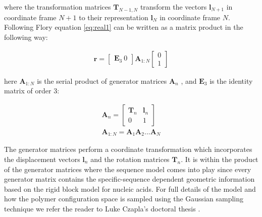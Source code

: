 where the transformation matrices $\textbf{T}_{N-1,N}$ transform the
vectors $\textbf{l}_{N+1}$ in coordinate frame $N+1$ to their
representation $\textbf{l}_{N}$ in coordinate frame $N$.
Following Flory \cite{flory1969} equation \ref{eq:real1} can be
written as a matrix product in the following way:

\begin{gather}
\textbf{r}= \begin{bmatrix}\textbf{E}_{3}~ 0 \end{bmatrix} \textbf{A}_{1:N}\begin{bmatrix} 0 \\ 1 \end{bmatrix}
\end{gather}

here $\textbf{A}_{1:N}$ is the serial product of generator matrices
$\textbf{A}_{n}$ \cite{marky1994a}, and $\textbf{E}_{3}$ is the
identity matrix of order 3:

\begin{gather}
\textbf{A}_{n} =
\begin{bmatrix}
\textbf{T}_{n} & \textbf{l}_{n} \\
0 & 1
\end{bmatrix}\\
\textbf{A}_{1:N}=\textbf{A}_{1}\textbf{A}_{2}...\textbf{A}_{N}
\end{gather}

The  generator  matrices  perform  a coordinate  transformation  which
incorporates  the   displacement  vectors  $\textbf{l}_{n}$   and  the
rotation matrices  $\textbf{T}_{n}$. It is  within the product  of the
generator  matrices where  the sequence  model comes  into  play since
every  generator  matrix  contains  the  specific-sequence  dependent
geometric  information based  on  the rigid  block  model for  nucleic
acids.  For full details of the model and how the polymer configuration
space is  sampled using the  Gaussian sampling technique we  refer the
reader to Luke Czapla's doctoral thesis \cite{czapla2009}.














